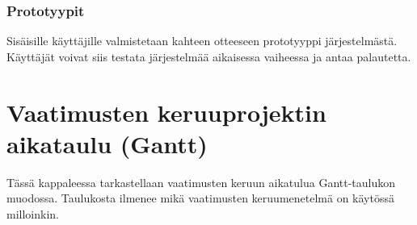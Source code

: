         \subsubsection*{Prototyypit}

        Sisäisille käyttäjille valmistetaan kahteen otteeseen prototyyppi järjestelmästä. Käyttäjät voivat siis testata järjestelmää aikaisessa vaiheessa ja antaa palautetta.
        \section{Vaatimusten keruuprojektin aikataulu (Gantt)}

        Tässä kappaleessa tarkastellaan vaatimusten keruun aikatulua Gantt-taulukon muodossa. Taulukosta ilmenee mikä vaatimusten keruumenetelmä on käytössä milloinkin.



